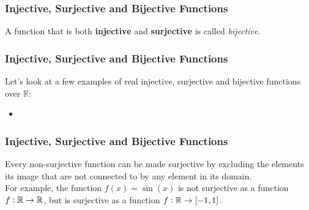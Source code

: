 \begin{frame}
  \frametitle{Injective, Surjective and Bijective Functions}
  A function that is both \textbf{injective} and \textbf{surjective} is called \emph{bijective}.
\end{frame}

\begin{frame}
  \frametitle{Injective, Surjective and Bijective Functions}
  \begin{presentation_example}
    Let's look at a few examples of real injective, surjective and bijective functions over $\mathbb{R}$:
    \begin{itemize}
      \item
        \begin{figure}[H]
          \centering
        \end{figure}
    \end{itemize}
  \end{presentation_example}
\end{frame}

\begin{frame}
  \frametitle{Injective, Surjective and Bijective Functions}
  \begin{presentation_note}
    Every non-surjective function can be made surjective by excluding the elements its image that are not connected to by any element in its domain.\\

    For example, the function $f(x)=\sin(x)$ is not surjective as a function $f:\mathbb{R}\rightarrow\mathbb{R}$, but is surjective as a function $f:\mathbb{R}\rightarrow[-1,1]$.
  \end{presentation_note}
\end{frame}

